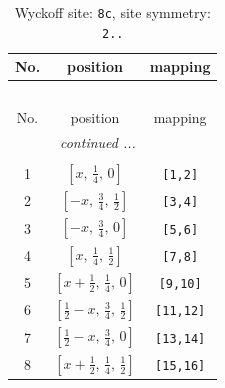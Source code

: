 \documentclass[fleqn,8pt]{jsarticle}
\begin{document}
\begin{longtable}{ccc}
\caption{Wyckoff site: {\tt 8c}, site symmetry: {\tt 2..}}
 \\
 \hline \hline
No. & position & mapping \\ \hline \endfirsthead

\multicolumn{2}{l}{\tablename\ \thetable{}} \\
 \hline \hline
No. & position & mapping \\ \hline \endhead

 \hline \hline
\multicolumn{2}{r}{\footnotesize\it continued ...} \\ \endfoot

 \hline \hline
\multicolumn{2}{r}{} \\ \endlastfoot

1 & $\left[ x,\, \frac{1}{4},\, 0 \right]$ & {\tt [1,2]} \\ \hline
2 & $\left[ - x,\, \frac{3}{4},\, \frac{1}{2} \right]$ & {\tt [3,4]} \\ \hline
3 & $\left[ - x,\, \frac{3}{4},\, 0 \right]$ & {\tt [5,6]} \\ \hline
4 & $\left[ x,\, \frac{1}{4},\, \frac{1}{2} \right]$ & {\tt [7,8]} \\ \hline
5 & $\left[ x + \frac{1}{2},\, \frac{1}{4},\, 0 \right]$ & {\tt [9,10]} \\ \hline
6 & $\left[ \frac{1}{2} - x,\, \frac{3}{4},\, \frac{1}{2} \right]$ & {\tt [11,12]} \\ \hline
7 & $\left[ \frac{1}{2} - x,\, \frac{3}{4},\, 0 \right]$ & {\tt [13,14]} \\ \hline
8 & $\left[ x + \frac{1}{2},\, \frac{1}{4},\, \frac{1}{2} \right]$ & {\tt [15,16]} \\
\end{longtable}
\renewcommand{\arraystretch}{1.2}
\end{document}
